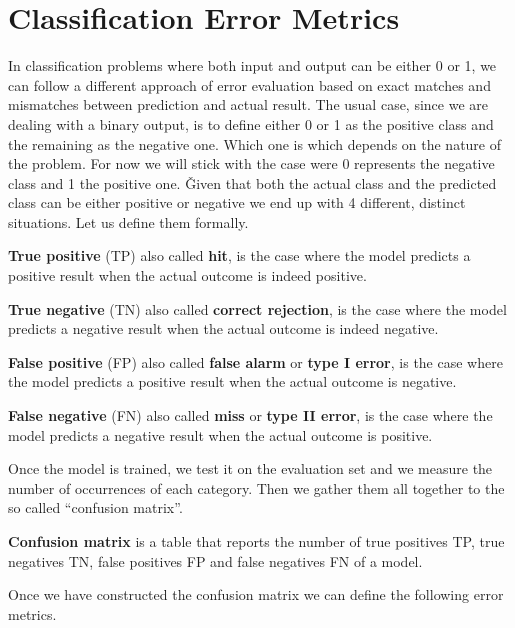 \section{Classification Error Metrics}

In classification problems where both input and output can be either 0 or 1, we can follow a different approach of
error evaluation based on exact matches and mismatches between prediction and actual result. The usual case, since we
are dealing with a binary output, is to define either 0 or 1 as the positive class and the remaining as the negative
one. Which one is which depends on the nature of the problem. For now we will stick with the case were 0 represents
the negative class and 1 the positive one. \v

Given that both the actual class and the predicted class can be either positive or negative we end up with 4
different, distinct situations. Let us define them formally.

\textbf{True positive} (TP) also called \textbf{hit}, is the case where the model predicts a positive result when the
actual outcome is indeed positive.
\ed

\textbf{True negative} (TN) also called \textbf{correct rejection}, is the case where the model predicts a negative
result when the actual outcome is indeed negative.
\ed

\textbf{False positive} (FP) also called \textbf{false alarm} or \textbf{type I error}, is the case where the model
predicts a positive result when the actual outcome is negative.
\ed

\textbf{False negative} (FN) also called \textbf{miss} or \textbf{type II error}, is the case where the model
predicts a negative result when the actual outcome is positive.
\ed

Once the model is trained, we test it on the evaluation set and we measure the number of occurrences of each category. 
Then we gather them all together to the so called ``confusion matrix''.

\textbf{Confusion matrix} is a table that reports the number of true positives TP, true negatives TN, false positives
FP and false negatives FN of a model.
\ed

\vspace{-5pt}


Once we have constructed the confusion matrix we can define the following error metrics.


